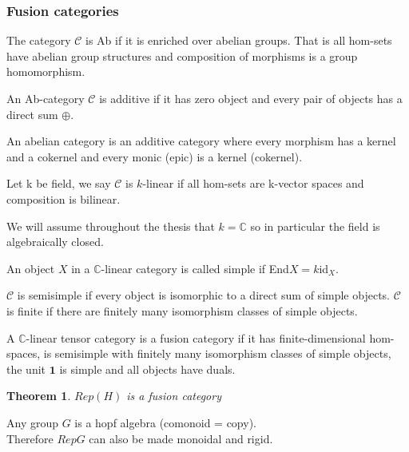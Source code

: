 \documentclass{article}
\newtheorem{theorem}{Theorem}[section]
\newenvironment{definition}[1][Definition]{\begin{trivlist}
\item[\hskip \labelsep {\bfseries #1}]}{\end{trivlist}}
\newenvironment{example}[1][Example]{\begin{trivlist}
\item[\hskip \labelsep {\bfseries #1}]}{\end{trivlist}}
\begin{document}
\subsubsection{Fusion categories}
\begin{definition}
The category $\mathcal{C}$ is Ab if it is enriched over abelian groups. That is all hom-sets have abelian group structures and composition of morphisms is a group homomorphism. 
\end{definition}
\begin{definition}
An Ab-category $\mathcal{C}$ is additive if it has zero object and every pair of objects has a direct sum $\oplus$.
\end{definition}
\begin{definition}
An abelian category is an additive category where every morphism has a kernel and a
cokernel and every monic (epic) is a kernel (cokernel).
\end{definition}
\begin{definition}
Let k be field, we say $\mathcal{C}$ is $k$-linear if all hom-sets are k-vector spaces and composition is bilinear.
\end{definition}
We will assume throughout the thesis that $k=\mathbb{C}$ so in particular the field is algebraically closed. 
\begin{definition}
An object $X$ in a $\mathbb{C}$-linear category is called simple if End$X=k$id$_X$.
\end{definition}
\begin{definition}
$\mathcal{C}$ is semisimple if every object is isomorphic to a direct sum of simple objects. $\mathcal{C}$ is finite if there are finitely many isomorphism classes of simple objects.
\end{definition}
\begin{definition}
A $\mathbb{C}$-linear tensor category is a fusion category if it has finite-dimensional hom-spaces, is semisimple with finitely many isomorphism classes of simple objects, the unit $\mathbf{1}$ is simple  and all objects have duals.
\end{definition}

\begin{theorem}
$Rep(H)$ is a fusion category
\end{theorem}

\begin{example}
Any group $G$ is a hopf algebra (comonoid = copy).\\
Therefore $RepG$ can also be made monoidal and rigid.
\end{example}
\end{document}
